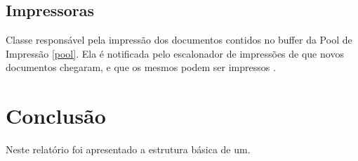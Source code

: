 \documentclass[12pt]{article}
\begin{document}
\subsection{Impressoras}
	Classe responsável pela impressão dos documentos contidos  no buffer da Pool de Impressão \ref{pool}.
	Ela é notificada pelo escalonador de impressões de que novos documentos chegaram, e que os mesmos podem ser impressos .


\section{Conclusão}
Neste relatório foi apresentado a estrutura básica de um.



\end{document}
